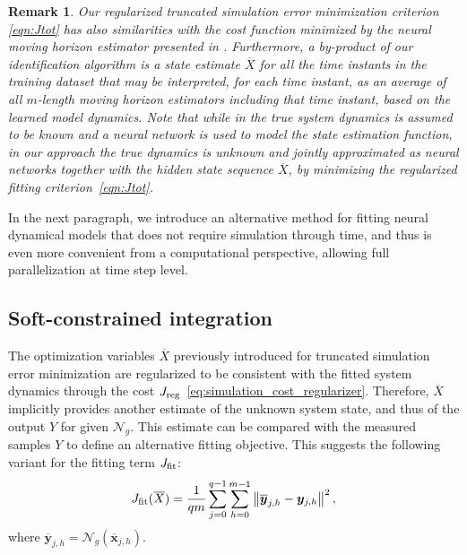 \documentclass{article} %
\newtheorem{remark}{Remark}{\normalfont}{\normalfont}
\newcommand{\NN}{\mathcal{N}} %
\newcommand{\batchsize}{q}
\newcommand{\seqlen}{m}
\newcommand{\tens}[1]{\bm{#1}}
\newcommand{\hidden}[1]{\overline{#1}}
\newcommand{\norm}[1]{\left\lVert#1\right\rVert}
\begin{document}
\begin{remark}
{
Our regularized truncated simulation error minimization criterion \eqref{eqn:Jtot} has also similarities with the cost function minimized by the neural moving horizon estimator presented in \cite{alessandri2011moving}. Furthermore, a by-product of our identification algorithm is a state estimate $\hidden{X}$ for all the time instants in the training dataset that may be interpreted,
for each time instant, as an average of all $m$-length moving horizon estimators including that time instant, based on the learned model dynamics. 
Note that while in \cite{alessandri2011moving} the true system dynamics is assumed to be known and a neural network is used to model the state estimation function, in our approach the true dynamics is unknown and jointly approximated as neural networks together with the hidden state sequence $\hidden{X}$, by minimizing the regularized fitting criterion~\eqref{eqn:Jtot}.
}
\end{remark}

 In the next paragraph, we introduce an alternative method for fitting neural dynamical models that does not require simulation through time, and thus is even more convenient from a computational perspective, allowing full parallelization at time step level. %

\subsection{Soft-constrained integration}
The optimization variables $\hidden{X}$ previously introduced  for truncated  simulation error minimization are regularized to be consistent with the fitted system dynamics through the cost $J_{\rm reg}$~\eqref{eq:simulation_cost_regularizer}. 
Therefore, $\hidden{X}$ implicitly provides another estimate of the unknown system state,
and thus of the output $Y$ for given $\NN_{g}$. This estimate can be compared with the measured samples $Y$ to define an alternative fitting objective. 
This suggests the following variant for the fitting term $J_{\rm fit}$: 
\begin{equation}
\label{eq:consistency_cost_fit}
J_{\rm fit}(\hidden{X}) = \frac{1}{\batchsize \seqlen}\sum_{j=0}^{\batchsize-1}\sum_{h=0}^{\seqlen-1} \norm{{\hidden{\tens{y}}}_{j,h} - {{\tens{y}}}_{j,h}}^2,
\end{equation}
where ${\hidden{\tens{y}}_{j,h}} = \NN_{\!g}({\hidden{\tens{x}}_{j,h}})$. 
\end{document}
